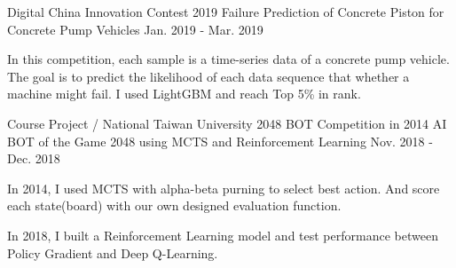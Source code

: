 \begin{cventries}
  \cventry
    {Digital China Innovation Contest 2019} %
    {Failure Prediction of Concrete Piston for Concrete Pump Vehicles} %
    {} %
    {Jan. 2019 - Mar. 2019} %
    {
      \begin{cvitems} %
        \item {In this competition, each sample is a time-series data of a concrete pump vehicle. The goal is to predict the likelihood of each data sequence that whether a machine might fail. I used LightGBM and reach Top 5\% in rank.}
      \end{cvitems}
    }

  \cventry
    {Course Project / National Taiwan University 2048 BOT Competition in 2014} %
    {AI BOT of the Game 2048 using MCTS and Reinforcement Learning} %
    {} %
    {Nov. 2018 - Dec. 2018} %
    {
      \begin{cvitems} %
        \item {In 2014, I used MCTS with alpha-beta purning to select best action. And score each state(board) with our own designed evaluation function.}
        \item {In 2018, I built a Reinforcement Learning model and test performance between Policy Gradient and Deep Q-Learning.}
      \end{cvitems}
    }

\end{cventries}
